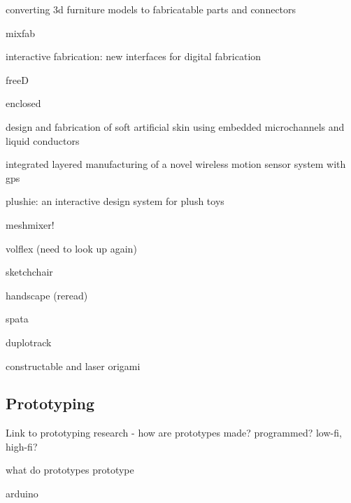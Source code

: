 \cite{lau-converting} converting 3d furniture models to fabricatable parts and connectors

\cite{weichel-mixfab} mixfab

\cite{willis-interactive} interactive fabrication: new interfaces for digital fabrication

\cite{zoran-freed} freeD

\cite{weichel-enclosed} enclosed

\cite{park-microchannels} design and fabrication of soft artificial skin using embedded microchannels and liquid conductors

\cite{navarette-gps} integrated layered manufacturing of a novel wireless motion sensor system with gps

\cite{mori-plushie} plushie: an interactive design system for plush toys

\cite{schmidt-meshmixer} meshmixer!

\cite{iwata-volflex} volflex (need to look up again)

\cite{saul-sketchchair} sketchchair

\cite{lee-handscape} handscape (reread)

\cite{weichel-spata} spata

\cite{gupta-duplotrack} duplotrack

\cite{mueller-constructable} \cite{mueller-laserorigami} constructable and laser origami

\subsection{Prototyping}
Link to prototyping research - how are prototypes made? programmed? low-fi, high-fi?

\cite{houde-prototypes} what do prototypes prototype

\cite{arduino} arduino
\cite{nam-AR}
\cite{maynes-aminzade-eyepatch}
\cite{nam-sketchingtuis}
\cite{lee-calder}
\cite{slyper-pressure}
\cite{sarik-tracebrush}
\cite{akaoka-displayobjects}
\cite{avrahami-switcharoo}
\cite{hartmann-reflective}
\cite{li-framewire}
\cite{willis-printedoptics}
\cite{sells-reprap}
\cite{hudson-boxes}
\cite{holman-tactiletape}
\cite{olberding-cuttable}
\cite{song-modelcraft}
\cite{macintyre-DART}
\cite{mueller-constructable}
\cite{song-modelcraft-tochi}
\cite{klemmer-papiermache}
\cite{willis-interactive}
\cite{weichel-enclosed}
\cite{fails-crayons}
\cite{marquardt-phidgets}
\cite{villar-voodooio}
\cite{yeo-stickear}
\cite{holman-sketchspace}
\cite{savage-sot}
\cite{yeh-sikuli}
\cite{doering-composition}
\cite{buechley-lilypad}
\cite{villar-gadgeteer}
\cite{greenberg-phidgets}
\cite{ono-touchandactivate}
\cite{hook-study}
\cite{hook-making}
\cite{resnick-scratch}
